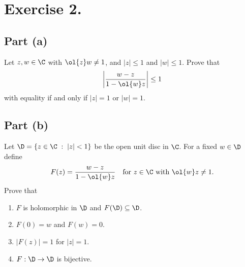 \section*{Exercise 2.}
\subsection*{Part (a)}
Let $z,w \in \C$ with $\ol{z} w \neq 1$, and $|z| \leq 1$ and $|w| \leq 1$. Prove that
\[ \left| \frac{w-z}{1-\ol{w}z} \right| \leq 1\]
with equality if and only if $|z| = 1$ or $|w| = 1$.

\subsection*{Part (b)}
Let $\D = \{ z \in \C \;:\; |z| < 1\}$ be the open unit disc in $\C$. For a fixed $w\in \D$ define
\[ F(z) = \frac{w-z}{1-\ol{w}z}\hspace*{1em} \mbox{for $z \in \C$ with $\ol{w}z \neq 1$.} \]
Prove that
\begin{enumerate}[label=(\roman*)]
    \item $F$ is holomorphic in $\D$ and $F(\D) \subseteq \D$.
    \item $F(0) = w$ and $F(w) = 0$.
    \item $|F(z)| = 1$ for $|z| = 1$.
    \item $F: \D \to \D$ is bijective.
\end{enumerate}
